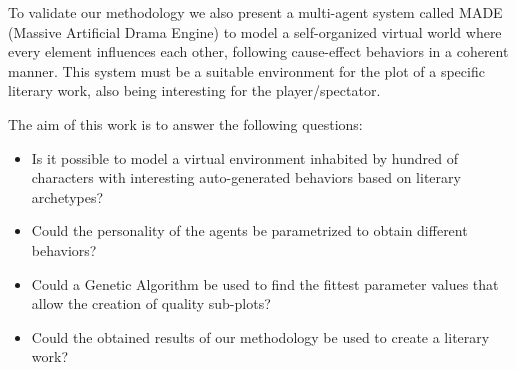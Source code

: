 \documentclass{sig-alternate}
\begin{document}










To validate our methodology we also present a multi-agent system called
MADE (Massive Artificial Drama Engine) to model a self-organized
virtual world where every element influences each other, following
cause-effect behaviors in a coherent manner. This system must be
a suitable environment for the plot of a specific literary work, also being
interesting for the player/spectator. %

The aim of this work is to answer the following questions:

\begin{itemize}
 \item Is it possible to model a virtual environment inhabited by hundred of characters with interesting auto-generated behaviors based on literary archetypes?
 \item Could the personality of the agents be parametrized to obtain different behaviors?
 \item Could a Genetic Algorithm be used to find the fittest parameter values that allow the creation of quality sub-plots?
 \item Could the obtained results of our methodology be used to create a literary work? %
\end{itemize}

\end{document}
